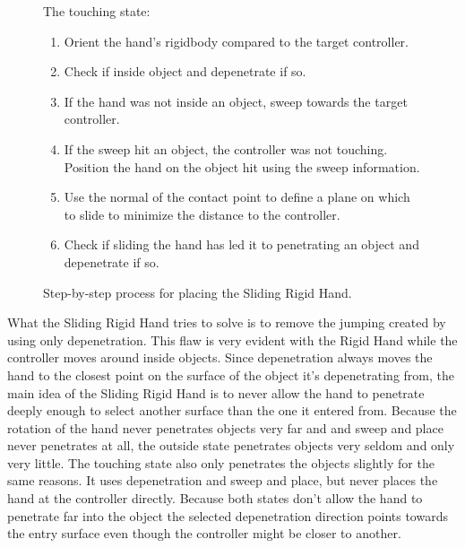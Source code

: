 \begin{figure}[H]
\begin{minipage}[t]{0.49\textwidth}
\small
The touching state:
\begin{enumerate}[noitemsep]
\item Orient the hand's rigidbody compared to the target controller.
\item Check if inside object and depenetrate if so.
\item If the hand was not inside an object, sweep towards the target controller.
\item If the sweep hit an object, the controller was not touching. Position the hand on the object hit using the sweep information.
\item Use the normal of the contact point to define a plane on which to slide to minimize the distance to the controller.
\item Check if sliding the hand has led it to penetrating an object and depenetrate if so.
\end{enumerate}
\end{minipage}
\caption{Step-by-step process for placing the Sliding Rigid Hand.}
\label{fig:stepByStepSlidingRigidHand}
\end{figure}


What the Sliding Rigid Hand tries to solve is to remove the jumping created by using only depenetration. This flaw is very evident with the Rigid Hand while the controller moves around inside objects. Since depenetration always moves the hand to the closest point on the surface of the object it's depenetrating from, the main idea of the Sliding Rigid Hand is to never allow the hand to penetrate deeply enough to select another surface than the one it entered from. Because the rotation of the hand never penetrates objects very far and and sweep and place never penetrates at all, the outside state penetrates objects very seldom and only very little. The touching state also only penetrates the objects slightly for the same reasons. It uses depenetration and sweep and place, but never places the hand at the controller directly. Because both states don't allow the hand to penetrate far into the object the selected depenetration direction points towards the entry surface even though the controller might be closer to another.

